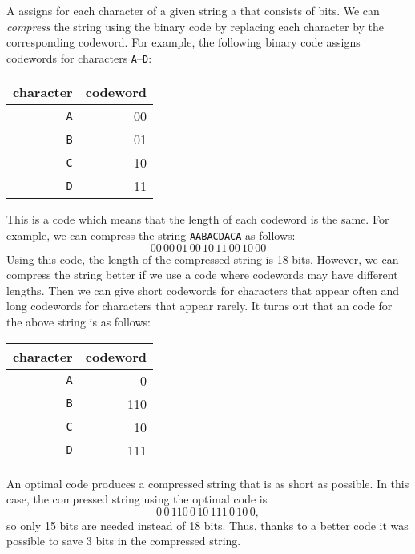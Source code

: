 
A  assigns for each character
of a given string a  that consists of bits.
We can \emph{compress} the string using the binary code
by replacing each character by the
corresponding codeword.
For example, the following binary code
assigns codewords for characters
\texttt{A}–\texttt{D}:
\begin{center}
\begin{tabular}{rr}
character & codeword \\
\hline
\texttt{A} & 00 \\
\texttt{B} & 01 \\
\texttt{C} & 10 \\
\texttt{D} & 11 \\
\end{tabular}
\end{center}
This is a  code
which means that the length of each
codeword is the same.
For example, we can compress the string
\texttt{AABACDACA} as follows:
\[00\,00\,01\,00\,10\,11\,00\,10\,00\]
Using this code, the length of the compressed
string is 18 bits.
However, we can compress the string better
if we use a  code
where codewords may have different lengths.
Then we can give short codewords for
characters that appear often
and long codewords for characters
that appear rarely.
It turns out that an  code
for the above string is as follows:
\begin{center}
\begin{tabular}{rr}
character & codeword \\
\hline
\texttt{A} & 0 \\
\texttt{B} & 110 \\
\texttt{C} & 10 \\
\texttt{D} & 111 \\
\end{tabular}
\end{center}
An optimal code produces a compressed string
that is as short as possible.
In this case, the compressed string using
the optimal code is
\[0\,0\,110\,0\,10\,111\,0\,10\,0,\]
so only 15 bits are needed instead of 18 bits.
Thus, thanks to a better code it was possible to
save 3 bits in the compressed string.

